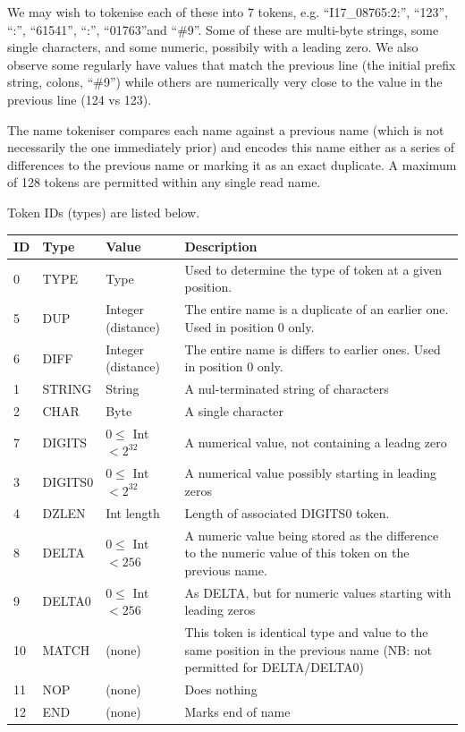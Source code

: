 \documentclass[a4paper]{article}
\begin{document}
We may wish to tokenise each of these into 7 tokens, e.g.
``I17\_08765:2:'', ``123'', ``:'', ``61541'', ``:'', ``01763''and
``\#9''. Some of these are multi-byte strings, some single characters,
and some numeric, possibily with a leading zero.  We also observe some
regularly have values that match the previous line (the initial prefix
string, colons, ``\#9'') while others are numerically very close to the
value in the previous line (124 vs 123).

The name tokeniser compares each name against a previous name (which
is not necessarily the one immediately prior) and encodes this name
either as a series of differences to the previous name or marking it
as an exact duplicate.  A maximum of 128 tokens are permitted within
any single read name.

Token IDs (types) are listed below.

\begin{tabular}{lllp{10cm}}
\hline
\textbf{ID} & \textbf{Type} & \textbf{Value} & \textbf{Description}\\
\hline
 0 & TYPE    & Type    & Used to determine the type of token at a given position. \\
\hline
 5 & DUP     & Integer (distance) & The entire name is a duplicate of an earlier one.  Used in position 0 only.\\
 6 & DIFF    & Integer (distance) & The entire name is differs to earlier ones.  Used in position 0 only.\\
\hline
 1 & STRING  & String  & A nul-terminated string of characters \\
 2 & CHAR    & Byte    & A single character \\
 7 & DIGITS  & $0 \le$ Int $< 2^{32}$ & A numerical value, not containing a leadng zero \\
 3 & DIGITS0 & $0 \le$ Int $< 2^{32}$ & A numerical value possibly starting in leading zeros \\
 4 & DZLEN   & Int length & Length of associated DIGITS0 token.\\
 8 & DELTA  & $0 \le$ Int $< 256$   & A numeric value being stored as the difference to the numeric value of this token on the previous name. \\
 9 & DELTA0 & $0 \le$ Int $< 256$ & As DELTA, but for numeric values starting with leading zeros \\
10 & MATCH   & (none) & This token is identical type and value to the same position in the previous name (NB: not permitted for DELTA/DELTA0)\\
11 & NOP & (none) & Does nothing\\
12 & END     & (none) & Marks end of name\\
\hline
\end{tabular}
\end{document}
